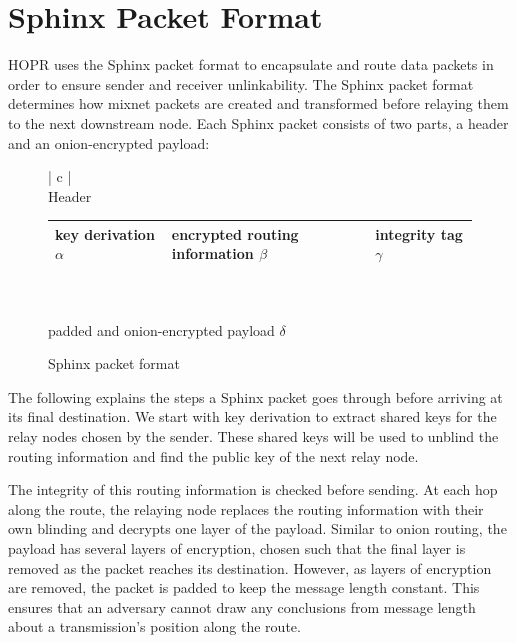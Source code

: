 \section{Sphinx Packet Format}
\label{sec:sphinx}

HOPR uses the Sphinx packet format \cite{sphinxpaper} to encapsulate and route data packets in order to ensure sender and receiver unlinkability. The Sphinx packet format determines how mixnet packets are created and transformed before relaying them to the next downstream node. Each Sphinx packet consists of two parts, a header and an onion-encrypted payload:

\begin{figure}[H]
    \centering
    \begin{tabular}{| c |}
        \hline
        \\[-0.8em]
        Header                                       \\[0.2em]
        \begin{tabular}{| m{} | m{} | m{} |}
            \hline
            key derivation $\alpha$ & encrypted routing information $\beta$ & integrity tag $\gamma$ \\
            \hline
        \end{tabular}                    \\[0.9em]
        \hline
        \hline
        \\[-0.7em]
        padded and onion-encrypted payload  $\delta$ \\[0.7em]
        \hline
    \end{tabular}
    \label{fig:Sphinx packet format}
    \caption{Sphinx packet format}
\end{figure}


The following explains the steps a Sphinx packet goes through before arriving at its final destination. We start with key derivation to extract shared keys for the relay nodes chosen by the sender. These shared keys will be used to unblind the routing information and find the public key of the next relay node. 

The integrity of this routing information is checked before sending. At each hop along the route, the relaying node replaces the routing information with their own blinding and decrypts one layer of the payload. Similar to onion routing, the payload has several layers of encryption, chosen such that the final layer is removed as the packet reaches its destination. However, as layers of encryption are removed, the packet is padded to keep the message length constant. This ensures that an adversary cannot draw any conclusions from message length about a transmission's position along the route.

